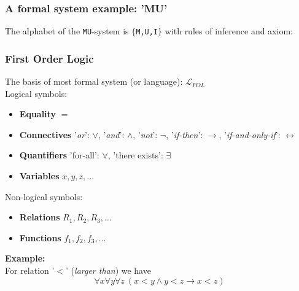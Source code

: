 \documentclass[10pt,danish]{beamer}
\begin{document}
\begin{frame}
 \frametitle{A formal system example: 'MU'}
The alphabet of the \texttt{MU}-system is $\{$\texttt{M,U,I}$\}$ with rules of inference and axiom:
\end{frame}

\begin{frame}
	\frametitle{First Order Logic}
	The basis of most formal system (or language): $\mathcal{L}_{FOL}$\\
	Logical symbols:
	\begin{itemize}
	\item \textbf{Equality} $=$
	\item \textbf{Connectives} '\textit{or}': $\vee$, '\textit{and}': $\wedge$, '\textit{not}': $\neg$, '\textit{if-then}': $\rightarrow$, '\textit{if-and-only-if}': $\leftrightarrow$
	\item \textbf{Quantifiers} 'for-all': $\forall$, 'there exists': $\exists$
	\item \textbf{Variables} $x,y,z,...$
	\end{itemize}
	Non-logical symbols:
	\begin{itemize}
	\item \textbf{Relations} $R_1, R_2, R_3,\ldots$
	\item \textbf{Functions} $f_1,f_2,f_3,\ldots$
	\end{itemize}
	\textbf{Example:}\\
For relation '$<$' (\textit{larger than}) we have
\begin{equation}
\forall x \forall y \forall z \ (x<y \wedge y<z \rightarrow x<z)
\end{equation}
\end{frame}
\end{document}

